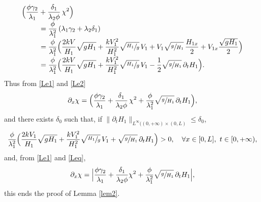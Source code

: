 \documentclass[11pt]{article}
\numberwithin{equation}{section}
\theoremstyle{definition}
\begin{document}
\begin{equation}
\begin{split}
\Bigl(\frac{\phi\gamma_{2}}{\lambda_{1}}&+\frac{\delta_{1}}{\lambda_{2}\phi}\,\chi^{2}\Bigr)\\[-3pt]
&=\frac{\phi}{\lambda_{1}^{2}}\left(\lambda_{1}\gamma_{2}+\lambda_{2}\delta_{1}\right)\\[-3pt]
&=\frac{\phi}{\lambda_{1}^{2}} \Bigl(\frac{2kV}{H_{1}}\sqrt{gH_{1}}+\frac{kV_{1}^{2}}{H_{1}^{2}}\sqrt{\sfrac{H_{1}}{g}}\,V_{1}+V_{1}\sqrt{\sfrac{g}{H_{1}}}\,\frac{H_{1x}}{2}+V_{1x}\frac{\sqrt{gH_{1}}}{2} \Bigr)\\[-3pt]
&=\frac{\phi}{\lambda_{1}^{2}} \Bigl(\frac{2kV}{H_{1}}\sqrt{gH_{1}}+\frac{kV_{1}^{2}}{H_{1}^{2}}\sqrt{\sfrac{H_{1}}{g}}\,V_{1}-\frac{1}{2}\sqrt{\sfrac{g}{H_{1}}}\,\partial_{t}H_{1} \Bigr).
\end{split}
\label{Le2}
\end{equation}
Thus from \eqref{Le1} and \eqref{Le2}
\begin{equation}
\partial_{x}\chi= \Bigl(\frac{\phi\gamma_{2}}{\lambda_{1}}+\frac{\delta_{1}}{\lambda_{2}\phi}\,\chi^{2}+{\frac{\phi}{\lambda_{1}^{2}}}\sqrt{\sfrac{g}{H_{1}}}\,\partial_{t}H_{1} \Bigr),
\label{Leq}
\end{equation}
{and} there exists $\delta_{0}$ such that, if $\lVert \partial_{t}H_{1}\rVert_{L^{\infty}((0,+\infty)\times(0,L)}\leq \delta_{0}$,
\begin{equation*}
\frac{\phi}{\lambda_{1}^{2}} \Bigl(\frac{2kV_{1}}{H_{1}}\sqrt{gH_{1}}+\frac{kV_{1}^{2}}{H_{1}^{2}}\sqrt{\sfrac{H_{1}}{g}}\,V_{1}+\sqrt{\sfrac{g}{H_{1}}}\,\partial_{t}H_{1} \Bigr)>0,\quad\forall x\in[0,L],\ t\in[0,+\infty),
\end{equation*}
and, from \eqref{Le1} and \eqref{Leq},
\begin{equation*}
\partial_{x}\chi= \Bigl |\frac{\phi\gamma_{2}}{\lambda_{1}}+\frac{\delta_{1}}{\lambda_{2}\phi}\chi^{2}+{\frac{\phi}{\lambda_{1}^{2}}}\sqrt{\sfrac{g}{H_{1}}}\,\partial_{t}H_{1} \Bigr|,
\end{equation*}
this ends the proof of Lemma \ref{lem2}.
\end{document}
